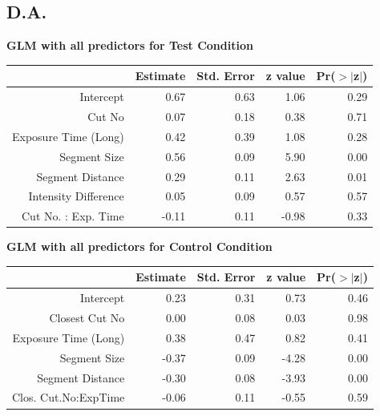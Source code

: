 \documentclass{article}
\begin{document}
\subsection*{D.A.}
\textbf{GLM with all predictors for Test Condition}
\begin{table}[ht]
\centering
\begin{tabular}{rrrrr}
  \hline
 & Estimate & Std. Error & z value & Pr($>$$|$z$|$) \\ 
  \hline
Intercept & 0.67 & 0.63 & 1.06 & 0.29 \\ 
  Cut No & 0.07 & 0.18 & 0.38 & 0.71 \\ 
  Exposure Time (Long) & 0.42 & 0.39 & 1.08 & 0.28 \\ 
  Segment Size & 0.56 & 0.09 & 5.90 & 0.00 \\ 
  Segment Distance & 0.29 & 0.11 & 2.63 & 0.01 \\ 
  Intensity Difference & 0.05 & 0.09 & 0.57 & 0.57 \\ 
  Cut No. : Exp. Time & -0.11 & 0.11 & -0.98 & 0.33 \\ 
   \hline
\end{tabular}
\end{table}

\textbf{GLM with all predictors for Control Condition}
\begin{table}[ht]
\centering
\begin{tabular}{rrrrr}
  \hline
 & Estimate & Std. Error & z value & Pr($>$$|$z$|$) \\ 
  \hline
Intercept & 0.23 & 0.31 & 0.73 & 0.46 \\ 
  Closest Cut No & 0.00 & 0.08 & 0.03 & 0.98 \\ 
  Exposure Time (Long) & 0.38 & 0.47 & 0.82 & 0.41 \\ 
  Segment Size & -0.37 & 0.09 & -4.28 & 0.00 \\ 
  Segment Distance & -0.30 & 0.08 & -3.93 & 0.00 \\ 
  Clos. Cut.No:ExpTime & -0.06 & 0.11 & -0.55 & 0.59 \\ 
   \hline
\end{tabular}
\end{table}
\clearpage
\end{document}

